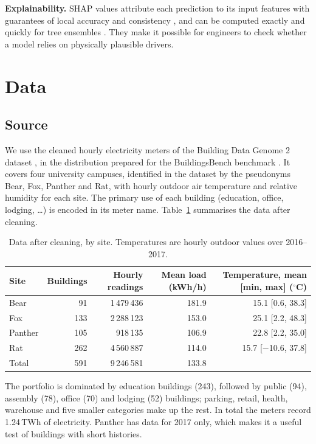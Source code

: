 \documentclass[11pt,a4paper]{article}
\begin{document}
\textbf{Explainability.} SHAP values attribute each prediction to its input features with guarantees of local accuracy
and consistency \citep{lundberg2017unified}, and can be computed exactly and quickly for tree ensembles
\citep{lundberg2020trees}. They make it possible for engineers to check whether a model relies on physically
plausible drivers.

\section{Data}\label{sec:data}

\subsection{Source}
We use the cleaned hourly electricity meters of the Building Data Genome 2 dataset \citep{miller2020bdg2}, in the
distribution prepared for the BuildingsBench benchmark \citep{emami2023buildingsbench}. It covers four university
campuses, identified in the dataset by the pseudonyms Bear, Fox, Panther and Rat, with hourly outdoor air
temperature and relative humidity for each site. The primary use of each building (education, office, lodging,
\ldots) is encoded in its meter name. Table~\ref{tab:sites} summarises the data after cleaning.

\begin{table}[ht]
\centering
\caption{Data after cleaning, by site. Temperatures are hourly outdoor values over 2016--2017.}
\label{tab:sites}
\small
\begin{tabular}{lrrrr}
\toprule
Site & Buildings & Hourly readings & Mean load (kWh/h) & Temperature, mean [min, max] ($^\circ$C) \\
\midrule
Bear    &  91 & 1\,479\,436 & 181.9 & 15.1 [0.6, 38.3] \\
Fox     & 133 & 2\,288\,123 & 153.0 & 25.1 [2.2, 48.3] \\
Panther & 105 &   918\,135 & 106.9 & 22.8 [2.2, 35.0] \\
Rat     & 262 & 4\,560\,887 & 114.0 & 15.7 [$-$10.6, 37.8] \\
\midrule
Total   & 591 & 9\,246\,581 & 133.8 & \\
\bottomrule
\end{tabular}
\end{table}

The portfolio is dominated by education buildings (243), followed by public (94), assembly (78), office (70) and
lodging (52) buildings; parking, retail, health, warehouse and five smaller categories make up the rest. In total
the meters record 1.24\,TWh of electricity. Panther has data for 2017 only, which makes it a useful test of
buildings with short histories.
\end{document}
